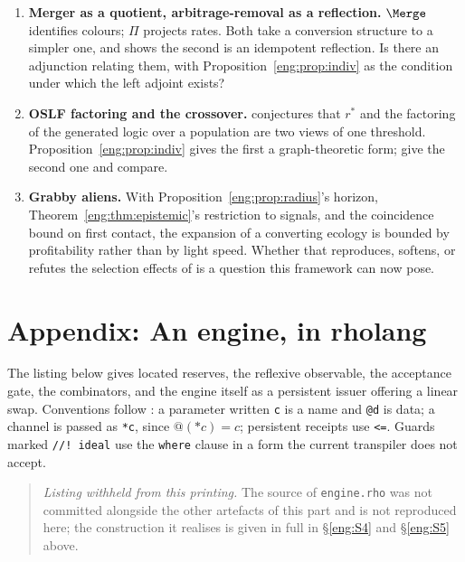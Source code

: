 \begin{enumerate}[itemsep=4pt]
channel --- so a learner must do science on its own medium. This is a
correction owed to \S\ref{sci:S4} of \chSci rather than a problem for this
note, and we flag it here because this note is what raises it.
\item \textbf{Merger as a quotient, arbitrage-removal as a reflection.}
$\Merge$ identifies colours; $\Pi$ projects rates. Both take a conversion
structure to a simpler one, and \cite[\S4]{vtok} shows the second is an
idempotent reflection. Is there an adjunction relating them, with
Proposition~\ref{eng:prop:indiv} as the condition under which the left adjoint
exists?
\item \textbf{OSLF factoring and the crossover.} \cite{compaut} conjectures
that $r^\ast$ and the factoring of the generated logic over a population
are two views of one threshold. Proposition~\ref{eng:prop:indiv} gives the
first a graph-theoretic form; give the second one and compare.
\item \textbf{Grabby aliens.} With Proposition~\ref{eng:prop:radius}'s horizon,
Theorem~\ref{eng:thm:epistemic}'s restriction to signals, and the coincidence
bound on first contact, the expansion of a converting ecology is bounded by
profitability rather than by light speed. Whether that reproduces, softens,
or refutes the selection effects of \cite{hanson} is a question this
framework can now pose.
\end{enumerate}


\section{Appendix: An engine, in rholang}\label{eng:S15}
\label{eng:app:rho}

The listing below gives located reserves, the reflexive observable, the
acceptance gate, the combinators, and the engine itself as a persistent
issuer offering a linear swap. Conventions follow \chGame: a parameter
written \texttt{c} is a name and \texttt{@d} is data; a channel is passed as
\texttt{*c}, since $@(*c) = c$; persistent receipts use \texttt{<=}.
Guards marked \texttt{//! ideal} use the \texttt{where} clause in a form the
current transpiler does not accept.

\begin{quote}
\small
\emph{Listing withheld from this printing.} The source of \texttt{engine.rho} was not committed alongside the other artefacts of this part and is not reproduced here; the construction it realises is given in full in \S\ref{eng:S4} and \S\ref{eng:S5} above.
\end{quote}

